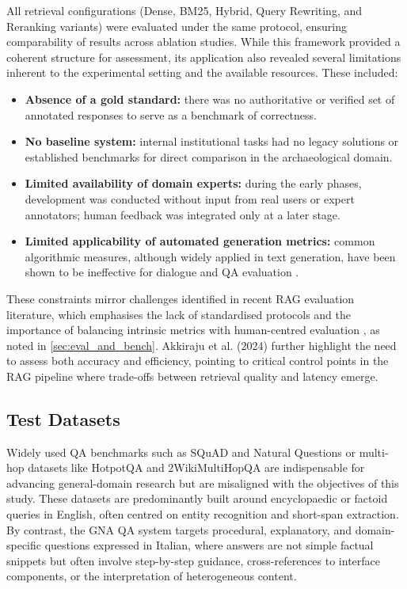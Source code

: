 \begin{spacing}{1.5}
All retrieval configurations (Dense, BM25, Hybrid, Query Rewriting, and Reranking variants) were evaluated under the same protocol, ensuring comparability of results across ablation studies. While this framework provided a coherent structure for assessment, its application also revealed several limitations inherent to the experimental setting and the available resources. These included:
\begin{itemize}
      \item \textbf{Absence of a gold standard:} there was no authoritative or verified set of annotated responses to serve as a benchmark of correctness.
      \item \textbf{No baseline system:} internal institutional tasks had no legacy solutions or established benchmarks for direct comparison in the archaeological domain.
      \item \textbf{Limited availability of domain experts:} during the early phases, development was conducted without input from real users or expert annotators; human feedback was integrated only at a later stage.
      \item \textbf{Limited applicability of automated generation metrics:} common algorithmic measures, although widely applied in text generation, have been shown to be ineffective for dialogue and QA evaluation \citep{deriu_survey_2020,liu_how_2016}.
\end{itemize}

These constraints mirror challenges identified in recent RAG evaluation literature, which emphasises the lack of standardised protocols and the importance of balancing intrinsic metrics with human-centred evaluation \citep{abeysinghe_challenges_2024}, as noted in \autoref{sec:eval_and_bench}. Akkiraju et al. (2024) further highlight the need to assess both accuracy and efficiency, pointing to critical control points in the RAG pipeline where trade-offs between retrieval quality and latency emerge.


\subsection{Test Datasets}\label{sec:datasets}
Widely used QA benchmarks such as SQuAD and Natural Questions or multi-hop datasets like HotpotQA \citep{yang_hotpotqa_2018} and 2WikiMultiHopQA \citep{ho_constructing_2020} are indispensable for advancing general-domain research but are misaligned with the objectives of this study. These datasets are predominantly built around encyclopaedic or factoid queries in English, often centred on entity recognition and short-span extraction. By contrast, the GNA QA system targets procedural, explanatory, and domain-specific questions expressed in Italian, where answers are not simple factual snippets but often involve step-by-step guidance, cross-references to interface components, or the interpretation of heterogeneous content.


\end{spacing}
